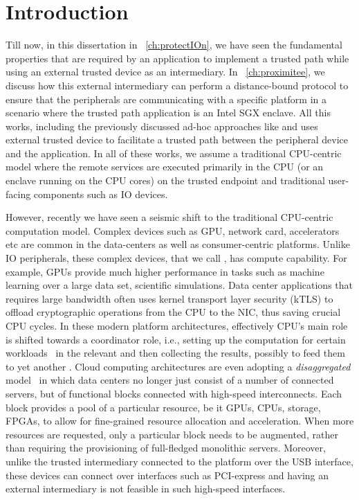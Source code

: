 \section{Introduction}
\label{sec: intro}


Till now, in this dissertation in \protection~\ref{ch:protectIOn}, we have seen the fundamental properties that are required by an application to implement a trusted path while using an external trusted device as an intermediary. In \proximitee~\ref{ch:proximitee}, we  discuss how this external intermediary can perform a distance-bound protocol to ensure that the peripherals are communicating with a specific platform in a scenario where the trusted path application is an Intel SGX enclave. All this works, including the previously discussed ad-hoc approaches like \integrikey and \integriscreen uses external trusted device to facilitate a trusted path between the peripheral device and the application. In all of these works, we assume a traditional CPU-centric model where the remote services are executed primarily in the CPU (or an enclave running on the CPU cores) on the trusted endpoint and traditional user-facing components such as IO devices.

However, recently we have seen a seismic shift to the traditional CPU-centric computation model. Complex devices such as GPU, network card, accelerators etc are common in the data-centers as well as consumer-centric platforms. Unlike IO peripherals, these complex devices, that we call \sphw, has compute capability. For example, GPUs provide much higher performance in tasks such as machine learning over a large data set, scientific simulations. Data center applications that requires large bandwidth often uses kernel transport layer security (kTLS) to offload cryptographic operations from the CPU to the NIC, thus saving crucial CPU cycles. In these modern platform architectures, effectively CPU's main role is shifted towards a coordinator role, i.e., setting up the computation for certain workloads~\cite{spec_hw_acc} in the relevant \sphw and then collecting the results, possibly to feed them to yet another \sphw. Cloud computing architectures are even adopting a \emph{disaggregated} model~\cite{disaggregatedcomp} in which data centers no longer just consist of a number of connected servers, but of functional blocks connected with high-speed interconnects. Each block provides a pool of a particular resource, be it GPUs, CPUs, storage, FPGAs, to allow for fine-grained resource allocation and acceleration. When more resources are requested, only a particular block needs to be augmented, rather than requiring the provisioning of full-fledged monolithic servers. Moreover, unlike the trusted intermediary connected to the platform over the USB interface, these \sphw devices can connect over interfaces such as PCI-express and having an external intermediary is not feasible in such high-speed interfaces. 


